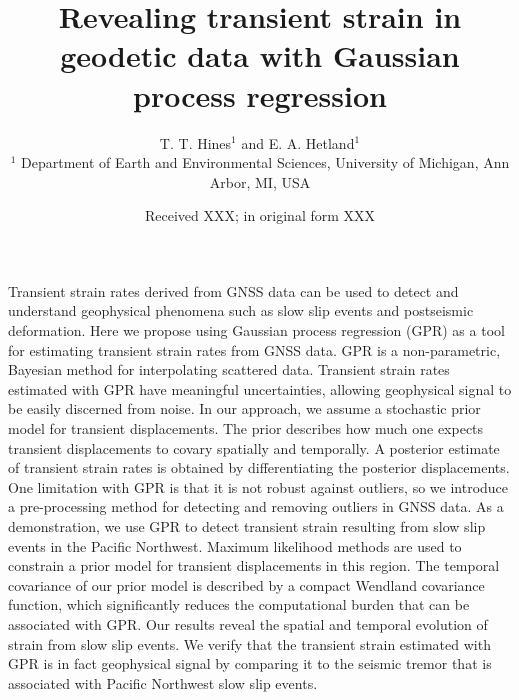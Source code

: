 \documentclass[extra,mreferee]{gji}
\title[Transient strain in geodetic data]
      {Revealing transient strain in geodetic data with Gaussian process regression}
\author[T. T. Hines and E. A. Hetland]
       {T. T. Hines$^1$ and E. A. Hetland$^1$ \\
        $^1$ Department of Earth and Environmental Sciences, University of Michigan, Ann Arbor, MI, USA}
\date{Received XXX; in original form XXX}
\begin{document}
\label{firstpage}

\maketitle

\newcommand{\pos}{\vec{x}} %
\newcommand{\data}{\mitbf{d}} %
\newcommand{\post}{\hat{u}} %
\newcommand{\points}{\mitbf{P}} %
\newcommand{\strain}{\dot\varepsilon} %
\newcommand{\E}[1]{\mathrm{E}\left[ #1 \right]} %
\newcommand{\Cov}[1]{\mathrm{Cov}\left[ #1 \right]} %
\newcommand{\e}{\mathrm{e}} %
\newcommand{\n}{\mathrm{n}} %
\newcommand{\G}{\mitbf{G}} %
\newcommand{\zeros}{\mitbf{0}} %
\newcommand{\eye}{\mitbf{I}} %

\begin{summary}


Transient strain rates derived from GNSS data can be used to detect
and understand geophysical phenomena such as slow slip events and
postseismic deformation. Here we propose using Gaussian process
regression (GPR) as a tool for estimating transient strain rates from
GNSS data. GPR is a non-parametric, Bayesian method for interpolating
scattered data. Transient strain rates estimated with GPR have
meaningful uncertainties, allowing geophysical signal to be easily
discerned from noise. In our approach, we assume a stochastic prior
model for transient displacements. The prior describes how much one
expects transient displacements to covary spatially and temporally. A
posterior estimate of transient strain rates is obtained by
differentiating the posterior displacements. One limitation with GPR
is that it is not robust against outliers, so we introduce a
pre-processing method for detecting and removing outliers in GNSS
data. As a demonstration, we use GPR to detect transient strain
resulting from slow slip events in the Pacific Northwest. Maximum
likelihood methods are used to constrain a prior model for transient
displacements in this region. The temporal covariance of our prior
model is described by a compact Wendland covariance function, which
significantly reduces the computational burden that can be associated
with GPR. Our results reveal the spatial and temporal evolution of
strain from slow slip events. We verify that the transient strain
estimated with GPR is in fact geophysical signal by comparing it to
the seismic tremor that is associated with Pacific Northwest slow slip
events.

\end{summary}
\end{document}
